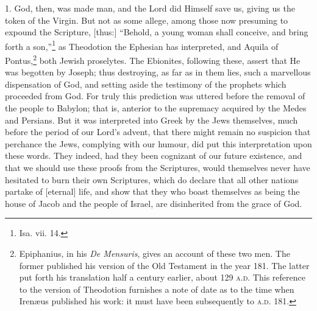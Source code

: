
1. God, then, was made man, and the Lord did Himself save us, giving us the token of the Virgin. But not as some allege, among those now presuming to expound the Scripture, [thus:] “Behold, a young woman shall conceive, and bring forth a son,”\footnote{Isa. vii. 14.} as Theodotion the Ephesian has interpreted, and Aquila of Pontus,\footnote{Epiphanius, in his \emph{De Mensuris}, gives an account of these two men. The former published his version of the Old Testament in the year 181. The latter put forth his translation half a century earlier, about 129 \textsc{a.d.} This reference to the version of Theodotion furnishes a note of date as to the time when Irenæus published his work: it must have been subsequently to \textsc{a.d.} 181.} both Jewish proselytes. The Ebionites, following these, assert that He was begotten by Joseph; thus destroying, as far as in them lies, such a marvellous dispensation of God, and setting aside the testimony of the prophets which proceeded from God. For truly this prediction was uttered before the removal of the people to Babylon; that is, anterior to the supremacy acquired by the Medes and Persians. But it was interpreted into Greek by the Jews themselves, much before the period of our Lord’s advent, that there might remain no suspicion that perchance the Jews, complying with our humour, did put this interpretation upon these words. They indeed, had they been cognizant of our future existence, and that we should use these proofs from the Scriptures, would themselves never have hesitated to burn their own Scriptures, which do declare that all other nations partake of [eternal] life, and show that they who boast themselves as being the house of Jacob and the people of Israel, are disinherited from the grace of God.

